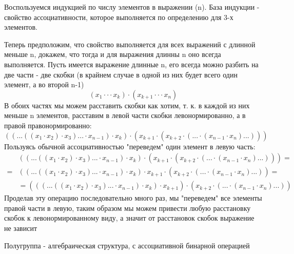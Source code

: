 \begin{Proof}
	Воспользуемся индукцией по числу элементов в выражении (n). База индукции - свойство ассоциативности, которое выполняется по определению для 3-х элементов.

	Теперь предположим, что свойство выполняется для всех выражений с длинной меньше n, докажем, что тогда и для выражения длинны n оно всегда выполняется. Пусть имеется выражение длинные n, его всегда можно разбить на две части - две скобки (в крайнем случае в одной из них будет всего один элемент, а во второй n-1)
	\[
		\left(x_1 \cdot \cdot \cdot x_k \right) \cdot \left(x_{k+1} \cdot \cdot \cdot x_n \right)
	\]
	В обоих частях мы можем расставить скобки как хотим, т. к. в каждой из них меньше n элементов, расставим в левой части скобки левонормированно, а в правой правонормированно:
	\[
		\left(\left( ... \left( \left( x_1 \cdot x_2 \right) \cdot x_3 \right) ... \cdot x_{n-1} \right) \cdot x_k \right) \cdot \left(x_{k+1} \cdot \left( x_{k+2} \cdot \left( ... \cdot \left( x_{n-1} \cdot x_n \right) ... \right) \right) \right)
	\]
	Пользуясь обычной ассоциативностью "переведем" один элемент в левую часть:
	\[
		\begin{split}
			& \left(\left( ... \left( \left( x_1 \cdot x_2 \right) \cdot x_3 \right) ... \cdot x_{n-1} \right) \cdot x_k \right) \cdot \left(x_{k+1} \cdot \left( x_{k+2} \cdot \left( ... \cdot \left( x_{n-1} \cdot x_n \right) ... \right) \right) \right) = \\
			= & \left(\left( ... \left( \left( x_1 \cdot x_2 \right) \cdot x_3 \right) ... \cdot x_{n-1} \right) \cdot x_k \right) \cdot x_{k+1} \cdot \left( x_{k+2} \cdot \left( ... \cdot \left( x_{n-1} \cdot x_n \right) ... \right) \right)  = \\
			& = \left(\left(\left( ... \left( \left( x_1 \cdot x_2 \right) \cdot x_3 \right) ... \cdot x_{n-1} \right) \cdot x_k \right) \cdot x_{k+1} \right) \cdot \left( x_{k+2} \cdot \left( ... \cdot \left( x_{n-1} \cdot x_n \right) ... \right) \right)
		\end{split}
	\]
	Проделав эту операцию последовательно много раз, мы "переведем" все элементы правой части в левую, таким образом мы можем привести любую расстановку скобок к левонормированному виду, а значит от расстановок скобок выражение не зависит
\end{Proof}

\begin{Def}
	Полугруппа - алгебраическая структура, с ассоциативной бинарной операцией
\end{Def}

